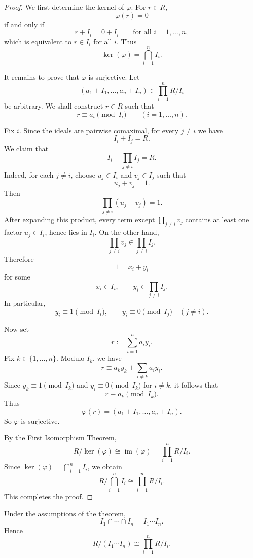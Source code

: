 \begin{proof}
    We first determine the kernel of $\varphi$. For $r\in R$,
    \[
        \varphi(r)=0
    \]
    if and only if
    \[
        r+I_i=0+I_i
        \qquad\text{for all } i=1,\dots,n,
    \]
    which is equivalent to $r\in I_i$ for all $i$. Thus
    \[
        \ker(\varphi)=\bigcap_{i=1}^n I_i.
    \]

    It remains to prove that $\varphi$ is surjective. Let
    \[
        (a_1+I_1,\dots,a_n+I_n)\in \prod_{i=1}^n R/I_i
    \]
    be arbitrary. We shall construct $r\in R$ such that
    \[
        r\equiv a_i \pmod{I_i}\qquad (i=1,\dots,n).
    \]

    Fix $i$. Since the ideals are pairwise comaximal, for every $j\ne i$ we have
    \[
        I_i+I_j=R.
    \]
    We claim that
    \[
        I_i+\prod_{j\ne i} I_j = R.
    \]
    Indeed, for each $j\ne i$, choose $u_j\in I_i$ and $v_j\in I_j$ such that
    \[
        u_j+v_j=1.
    \]
    Then
    \[
        \prod_{j\ne i}(u_j+v_j)=1.
    \]
    After expanding this product, every term except $\prod_{j\ne i} v_j$ contains at least
    one factor $u_j\in I_i$, hence lies in $I_i$. On the other hand,
    \[
        \prod_{j\ne i} v_j \in \prod_{j\ne i} I_j.
    \]
    Therefore
    \[
        1=x_i+y_i
    \]
    for some
    \[
        x_i\in I_i,\qquad y_i\in \prod_{j\ne i} I_j.
    \]
    In particular,
    \[
        y_i\equiv 1 \pmod{I_i},
        \qquad
        y_i\equiv 0 \pmod{I_j}\quad (j\ne i).
    \]

    Now set
    \[
        r:=\sum_{i=1}^n a_i y_i.
    \]
    Fix $k\in\{1,\dots,n\}$. Modulo $I_k$, we have
    \[
        r \equiv a_k y_k + \sum_{i\ne k} a_i y_i.
    \]
    Since $y_k\equiv 1 \pmod{I_k}$ and $y_i\equiv 0 \pmod{I_k}$ for $i\ne k$, it follows that
    \[
        r\equiv a_k \pmod{I_k}.
    \]
    Thus
    \[
        \varphi(r)=(a_1+I_1,\dots,a_n+I_n).
    \]
    So $\varphi$ is surjective.

    By the First Isomorphism Theorem,
    \[
        R/\ker(\varphi)\cong \operatorname{im}(\varphi)=\prod_{i=1}^n R/I_i.
    \]
    Since $\ker(\varphi)=\bigcap_{i=1}^n I_i$, we obtain
    \[
        R\Big/\bigcap_{i=1}^n I_i \cong \prod_{i=1}^n R/I_i.
    \]
    This completes the proof.
\end{proof}

\begin{corollary}
    Under the assumptions of the theorem,
    \[
        I_1\cap\cdots\cap I_n = I_1\cdots I_n.
    \]
    Hence
    \[
        R/(I_1\cdots I_n)\cong \prod_{i=1}^n R/I_i.
    \]
\end{corollary}

